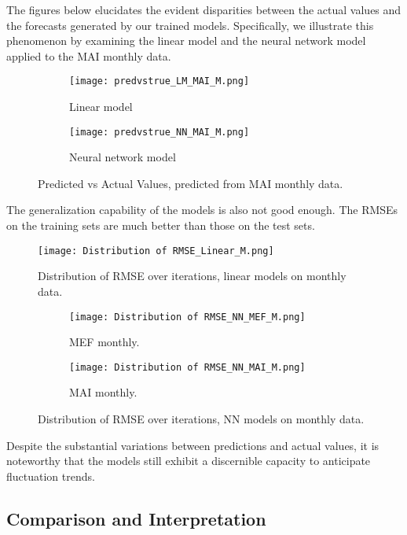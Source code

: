 \documentclass{article}
\begin{document}
The figures below elucidates the evident disparities between the actual values and the forecasts generated by our trained models. Specifically, we illustrate this phenomenon by examining the linear model and the neural network model applied to the MAI monthly data. 

\begin{figure}[H]
  \centering
  \begin{subfigure}{0.48\linewidth}
    \texttt{[image: predvstrue\_LM\_MAI\_M.png]}
    \caption{Linear model}
  \end{subfigure}
  \hfill
  \begin{subfigure}{0.48\linewidth}
    \texttt{[image: predvstrue\_NN\_MAI\_M.png]}
    \caption{Neural network model}
  \end{subfigure}
  \caption{Predicted vs Actual Values, predicted from MAI monthly data.}
  \label{fig:predvstrue}
\end{figure}

\noindent The generalization capability of the models is also not good enough. The RMSEs on the training sets are much better than those on the test sets.

\begin{figure}[H]
    \centering \texttt{[image: Distribution of RMSE\_Linear\_M.png]}
    \caption{Distribution of RMSE over iterations, linear models on monthly data.}
\end{figure}

\begin{figure}[H]
  \centering
  \begin{subfigure}{0.48\linewidth}
    \texttt{[image: Distribution of RMSE\_NN\_MEF\_M.png]}
    \caption{MEF monthly.}
  \end{subfigure}
  \hfill
  \begin{subfigure}{0.48\linewidth}
    \texttt{[image: Distribution of RMSE\_NN\_MAI\_M.png]}
    \caption{MAI monthly.}
  \end{subfigure}
  \caption{Distribution of RMSE over iterations, NN models on monthly data.}
\end{figure}

\noindent Despite the substantial variations between predictions and actual values, it is noteworthy that the models still exhibit a discernible capacity to anticipate fluctuation trends.

\subsection{Comparison and Interpretation}
\end{document}

